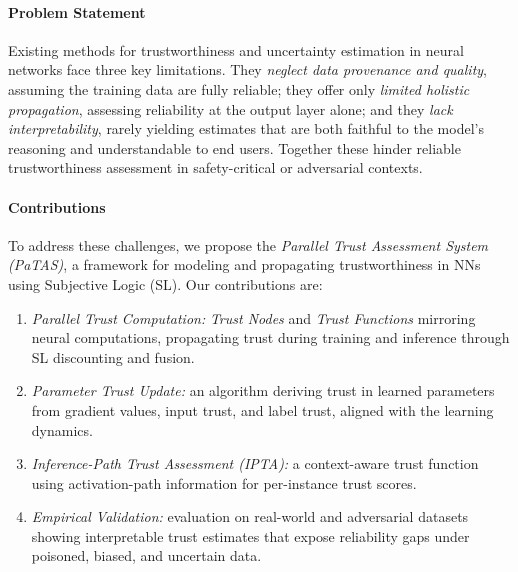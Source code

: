 \paragraph*{Problem Statement}
Existing methods for trustworthiness and uncertainty estimation in neural networks face three key limitations. They \emph{neglect data provenance and quality}, assuming the training data are fully reliable; they offer only \emph{limited holistic propagation}, assessing reliability at the output layer alone; and they \emph{lack interpretability}, rarely yielding estimates that are both faithful to the model's reasoning and understandable to end users. Together these hinder reliable trustworthiness assessment in safety-critical or adversarial contexts.

\paragraph*{Contributions}
To address these challenges, we propose the \emph{Parallel Trust Assessment System (PaTAS)}, a framework for modeling and propagating trustworthiness in NNs using Subjective Logic (SL). Our contributions are:
\begin{enumerate}
    \item \emph{Parallel Trust Computation:} \textit{Trust Nodes} and \textit{Trust Functions} mirroring neural computations, propagating trust during training and inference through SL discounting and fusion.
    \item \emph{Parameter Trust Update:} an algorithm deriving trust in learned parameters from gradient values, input trust, and label trust, aligned with the learning dynamics.
    \item \emph{Inference-Path Trust Assessment (IPTA):} a context-aware trust function using activation-path information for per-instance trust scores.
    \item \emph{Empirical Validation:} evaluation on real-world and adversarial datasets showing interpretable trust estimates that expose reliability gaps under poisoned, biased, and uncertain data.
\end{enumerate}

